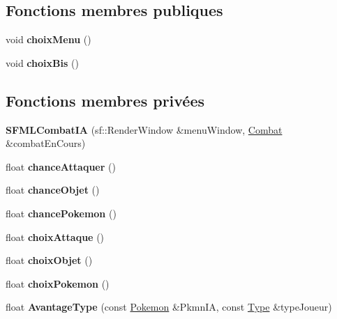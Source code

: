 \subsection*{Fonctions membres publiques}
\begin{DoxyCompactItemize}
\item 
\mbox{\label{class_s_f_m_l_combat_i_a_a2e93206e7bf49b3ba66c24447af70b72}} 
void {\bfseries choix\+Menu} ()
\item 
\mbox{\label{class_s_f_m_l_combat_i_a_a67a258bf9168e944933280bda649df6a}} 
void {\bfseries choix\+Bis} ()
\end{DoxyCompactItemize}
\subsection*{Fonctions membres privées}
\begin{DoxyCompactItemize}
\item 
\mbox{\label{class_s_f_m_l_combat_i_a_a28d96c82e5691a164a227dc40251dbed}} 
{\bfseries S\+F\+M\+L\+Combat\+IA} (sf\+::\+Render\+Window \&menu\+Window, \hyperlink{class_combat}{Combat} \&combat\+En\+Cours)
\item 
\mbox{\label{class_s_f_m_l_combat_i_a_a32146c12627aba57cacbf07540159b20}} 
float {\bfseries chance\+Attaquer} ()
\item 
\mbox{\label{class_s_f_m_l_combat_i_a_a92c72172f3285ea1579be3c2bb421d20}} 
float {\bfseries chance\+Objet} ()
\item 
\mbox{\label{class_s_f_m_l_combat_i_a_a1be9008eab6fa1176bf886adcccf4229}} 
float {\bfseries chance\+Pokemon} ()
\item 
\mbox{\label{class_s_f_m_l_combat_i_a_af9b43edd9121c917f2f2c46436157b75}} 
float {\bfseries choix\+Attaque} ()
\item 
\mbox{\label{class_s_f_m_l_combat_i_a_a870281c355931a91cd08642384fdfc92}} 
float {\bfseries choix\+Objet} ()
\item 
\mbox{\label{class_s_f_m_l_combat_i_a_a8fa0a4bd7c29655ccd4312f0d2a7f411}} 
float {\bfseries choix\+Pokemon} ()
\item 
\mbox{\label{class_s_f_m_l_combat_i_a_a7a2d4286d2fab3d1b74f9f6a1c92b580}} 
float {\bfseries Avantage\+Type} (const \hyperlink{class_pokemon}{Pokemon} \&Pkmn\+IA, const \hyperlink{_attaque_8h_a1d1cfd8ffb84e947f82999c682b666a7}{Type} \&type\+Joueur)
\end{DoxyCompactItemize}
